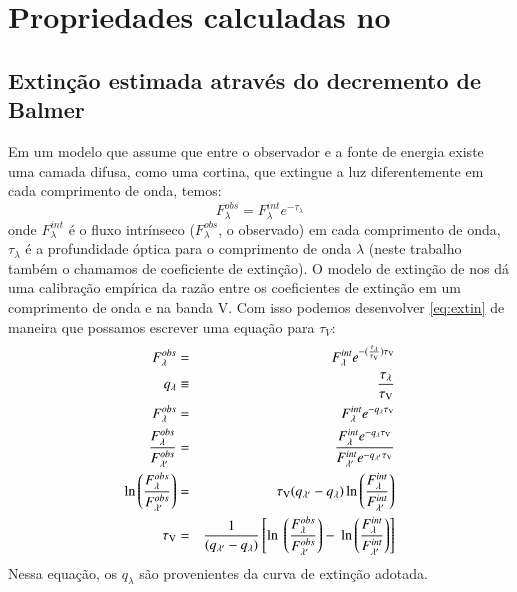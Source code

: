 


\chapter{Propriedades calculadas no \emldc}
\label{apendice:EMLprops}

\section{Extinção estimada através do decremento de Balmer}
\label{apendice:EMLprops:tauvneb}
Em um modelo que assume que entre o observador e a fonte de energia existe uma camada difusa, como uma cortina, que extingue a luz diferentemente em cada comprimento de onda, temos:
\begin{equation}
	F_\lambda^{obs} = F_\lambda^{int} e^{-\tau_\lambda}
    \label{eq:extin}
\end{equation}
\noindent onde $F_\lambda^{int}$ é o fluxo intrínseco ($F_\lambda^{obs}$, o observado) em cada comprimento de onda, $\tau_\lambda$ é a profundidade óptica para o comprimento de onda $\lambda$ (neste trabalho também o chamamos de coeficiente de extinção). O modelo de extinção de \citet{CCM1989a} nos dá uma calibração empírica da razão entre os coeficientes de extinção em um comprimento de onda e na banda V. Com isso podemos desenvolver \eqref{eq:extin} de maneira que possamos escrever uma equação para $\tau_V$:
\begin{eqnarray}
   F_\lambda^{obs} &=& F_\lambda^{int} e^{-(\frac{\tau_\lambda}{\tau_{\mathrm{V}}}) \tau_{\mathrm{V}}} \\
   q_\lambda &\equiv& \frac{\tau_\lambda}{\tau_{\mathrm{V}}} \\
   F_\lambda^{obs} &=& F_\lambda^{int} e^{-q_\lambda \tau_{\mathrm{V}}} \\
   \frac{F_\lambda^{obs}}{F_{\lambda^\prime}^{obs}} &=& \
 \frac{F_\lambda^{int} e^{-q_\lambda \tau_{\mathrm{V}}}}{F_{\lambda^\prime}^{int} e^{-q_{\lambda^\prime} \tau_{\mathrm{V}}}} \\
   \ln \left(\frac{F_\lambda^{obs}}{F_{\lambda^\prime}^{obs}}\right) &=& \
 \tau_{\mathrm{V}} (q_{\lambda^\prime} - q_\lambda) \ln \left(\frac{F_\lambda^{int}}{F_{\lambda^\prime}^{int}}\right) \\
   \tau_{\mathrm{V}} &=& \frac{1}{(q_{\lambda^\prime} - q_\lambda)} \left[\ln \
 \left(\frac{F_\lambda^{obs}}{F_{\lambda^\prime}^{obs}}\right) - \
 \ln \left(\frac{F_\lambda^{int}}{F_{\lambda^\prime}^{int}}\right)\right]
 \label{eq:tauV}
\end{eqnarray}
\noindent Nessa equação, os $q_\lambda$ são provenientes da curva de extinção adotada.


